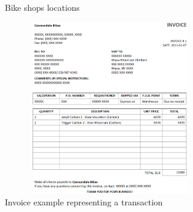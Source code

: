 \documentclass[
  ignorenonframetext,
]{beamer}
\begin{document}
\begin{frame}{}
\label{section-4}
\tiny

\begin{figure}


\caption{\label{fig-bike-shops-locations}Bike shops locations}

\end{figure}%
\end{frame}

\begin{frame}{}
\label{section-5}
\begin{figure}[H]

{\centering \includegraphics[width=3.64583in,height=2.96875in]{../000_images/001_example_invoice_transaction.png}

}

\caption{Invoice example representing a transaction}

\end{figure}%
\end{frame}
\end{document}

